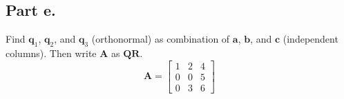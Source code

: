 \subsection{Part e.}
Find $\mathbf{q}_{1}$, $\mathbf{q}_{2}$, and $\mathbf{q}_{3}$ (orthonormal)
as combination of $\mathbf{a}$, $\mathbf{b}$, and $\mathbf{c}$ (independent
columns). Then write $\mathbf{A}$ as $\mathbf{QR}$.
\begin{equation}
    \mathbf{A} =
    \begin{bmatrix}
        1       &       2       &   4   \\
        0       &       0       &   5   \\
        0       &       3       &   6
    \end{bmatrix}
\end{equation}

